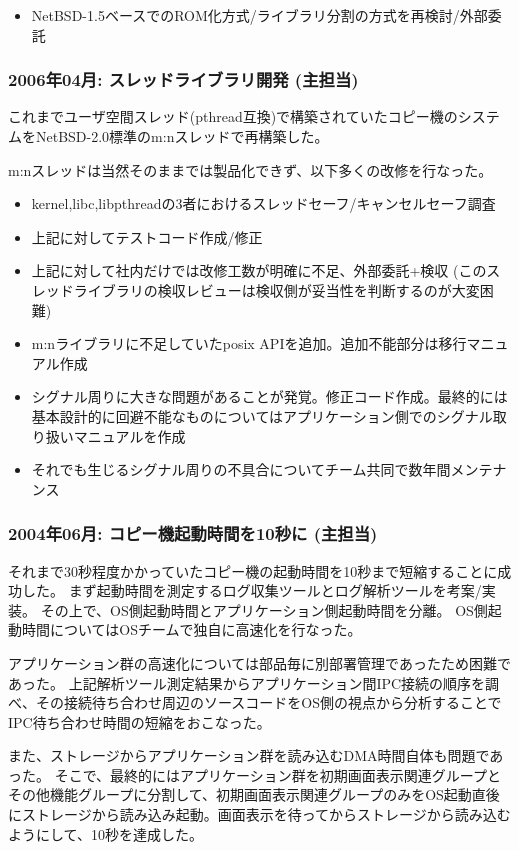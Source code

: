 \documentclass[letterpaper]{article}
\begin{document}
\begin{itemize}
  \item NetBSD-1.5ベースでのROM化方式/ライブラリ分割の方式を再検討/外部委託
\end{itemize}

\subsubsection*{2006年04月: スレッドライブラリ開発 (主担当)}
これまでユーザ空間スレッド(pthread互換)で構築されていたコピー機のシステムをNetBSD-2.0標準のm:nスレッドで再構築した。

m:nスレッドは当然そのままでは製品化できず、以下多くの改修を行なった。
\begin{itemize}
  \item kernel,libc,libpthreadの3者におけるスレッドセーフ/キャンセルセーフ調査
  \item 上記に対してテストコード作成/修正
  \item 上記に対して社内だけでは改修工数が明確に不足、外部委託+検収 (このスレッドライブラリの検収レビューは検収側が妥当性を判断するのが大変困難)
  \item m:nライブラリに不足していたposix APIを追加。追加不能部分は移行マニュアル作成
  \item シグナル周りに大きな問題があることが発覚。修正コード作成。最終的には基本設計的に回避不能なものについてはアプリケーション側でのシグナル取り扱いマニュアルを作成
  \item それでも生じるシグナル周りの不具合についてチーム共同で数年間メンテナンス
\end{itemize}

\subsubsection*{2004年06月: コピー機起動時間を10秒に (主担当)}
それまで30秒程度かかっていたコピー機の起動時間を10秒まで短縮することに成功した。
まず起動時間を測定するログ収集ツールとログ解析ツールを考案/実装。
その上で、OS側起動時間とアプリケーション側起動時間を分離。
OS側起動時間についてはOSチームで独自に高速化を行なった。

アプリケーション群の高速化については部品毎に別部署管理であったため困難であった。
上記解析ツール測定結果からアプリケーション間IPC接続の順序を調べ、その接続待ち合わせ周辺のソースコードをOS側の視点から分析することでIPC待ち合わせ時間の短縮をおこなった。

また、ストレージからアプリケーション群を読み込むDMA時間自体も問題であった。
そこで、最終的にはアプリケーション群を初期画面表示関連グループとその他機能グループに分割して、初期画面表示関連グループのみをOS起動直後にストレージから読み込み起動。画面表示を待ってからストレージから読み込むようにして、10秒を達成した。
\end{document}
